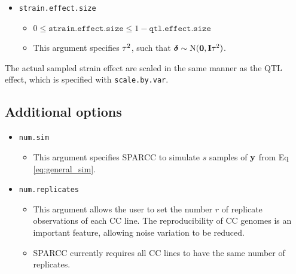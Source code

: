 \begin{itemize}
	\item \texttt{strain.effect.size}
    \begin{itemize}
    	\item $0 \le \texttt{strain.effect.size} \le 1 - \texttt{qtl.effect.size}$
    	\item This argument specifies $\tau^{2}$, such that $\boldsymbol{\delta} \sim \text{N}(\mathbf{0}, \mathbf{I}\tau^{2})$.
    \end{itemize}
\end{itemize}
The actual sampled strain effect are scaled in the same manner as the QTL effect, which is specified with \texttt{scale.by.var}.

\subsection{Additional options}

\begin{itemize}
	\item \texttt{num.sim}
    \begin{itemize}
    	\item This argument specifies SPARCC to simulate $s$ samples of $\mathbf{y}$ from Eq \ref{eq:general_sim}.
    \end{itemize}
    \item \texttt{num.replicates}
    \begin{itemize}
    	\item This argument allows the user to set the number $r$ of replicate observations of each CC line. The reproducibility of CC genomes is an important feature, allowing noise variation to be reduced.
        \item SPARCC currently requires all CC lines to have the same number of replicates.    
    \end{itemize}
\end{itemize}


